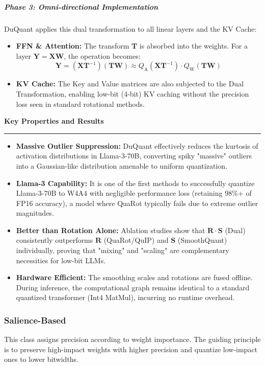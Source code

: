 \documentclass[11pt,a4paper]{article}
\newcommand{\problemp}[1]{%
  \par\medskip
  {\noindent\bfseries\normalsize\color{signcol}#1\par}%
  \vspace{0.4ex}%
  {\noindent\color{softgray}\rule{\linewidth}{0.6pt}\par}%
  \vspace{0.8ex}%
}
\theoremstyle{definition}
\begin{document}
\subparagraph{Phase 3: Omni-directional Implementation}
DuQuant applies this dual transformation to all linear layers and the KV Cache:
\begin{itemize}
  \item \textbf{FFN & Attention:} The transform $\bm{T}$ is absorbed into the weights. For a layer $\bm{Y} = \bm{X}\bm{W}$, the operation becomes:
    \begin{equation}
      \bm{Y} = (\bm{X}\bm{T}^{-1}) (\bm{T}\bm{W}) \approx Q_{\text{A}}(\bm{X}\bm{T}^{-1}) \cdot Q_{\text{W}}(\bm{T}\bm{W})
    \end{equation}
  \item \textbf{KV Cache:} The Key and Value matrices are also subjected to the Dual Transformation, enabling low-bit (4-bit) KV caching without the precision loss seen in standard rotational methods.
\end{itemize}

\problemp{Key Properties and Results}
\begin{itemize}
  \item \textbf{Massive Outlier Suppression:} DuQuant effectively reduces the kurtosis of activation distributions in Llama-3-70B, converting spiky "massive" outliers into a Gaussian-like distribution amenable to uniform quantization.
  \item \textbf{Llama-3 Capability:} It is one of the first methods to successfully quantize Llama-3-70B to W4A4 with negligible performance loss (retaining 98\%+ of FP16 accuracy), a model where QuaRot typically fails due to extreme outlier magnitudes.
  \item \textbf{Better than Rotation Alone:} Ablation studies show that $\bm{R} \cdot \bm{S}$ (Dual) consistently outperforms $\bm{R}$ (QuaRot/QuIP) and $\bm{S}$ (SmoothQuant) individually, proving that "mixing" and "scaling" are complementary necessities for low-bit LLMs.
  \item \textbf{Hardware Efficient:} The smoothing scales and rotations are fused offline. During inference, the computational graph remains identical to a standard quantized transformer (Int4 MatMul), incurring no runtime overhead.
\end{itemize}

\subsubsection{Salience-Based}
This class assigns precision according to weight importance.
The guiding principle is to preserve high-impact weights with higher precision and quantize low-impact ones to lower bitwidths.
\end{document}
